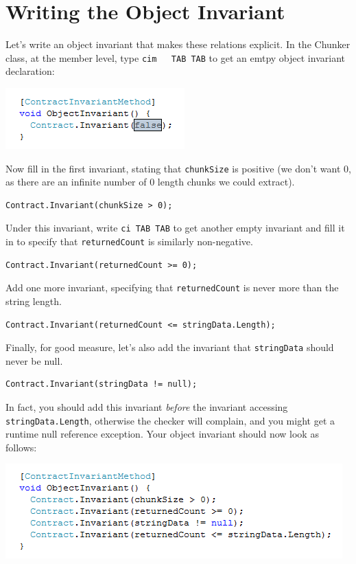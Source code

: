 \documentclass{article}
\newcommand{\code}[1]{\lstinline{#1}}
\begin{document}
\section{Writing the Object Invariant}
Let's write an object invariant that makes these relations
explicit. In the Chunker class, at the member level, type \code{cim
  TAB TAB} to get an emtpy object invariant declaration:
\begin{center}
  \includegraphics[width=.5\columnwidth]{objinv1.png}
\end{center}
Now fill in the first invariant, stating that \code{chunkSize} is
positive (we don't want 0, as there are an infinite number of 0
length chunks we could extract).
\begin{lstlisting}
Contract.Invariant(chunkSize > 0);
\end{lstlisting}
Under this invariant, write \code{ci TAB TAB} to get another empty
invariant and fill it in to specify that \code{returnedCount} is
similarly non-negative.
\begin{lstlisting}
Contract.Invariant(returnedCount >= 0);
\end{lstlisting}
Add one more invariant, specifying that \code{returnedCount}
is never more than the string length.
\begin{lstlisting}
Contract.Invariant(returnedCount <= stringData.Length);
\end{lstlisting}
Finally, for good measure, let's also add the invariant that 
\code{stringData} should never be null.
\begin{lstlisting}
Contract.Invariant(stringData != null);
\end{lstlisting}
In fact, you should add this invariant \emph{before} the invariant
accessing \code{stringData.Length}, otherwise the checker will
complain, and you might get a runtime null reference exception.
Your object invariant should now look as follows:
\begin{center}
  \includegraphics[width=.8\columnwidth]{objinv2.png}
\end{center}
\end{document}
